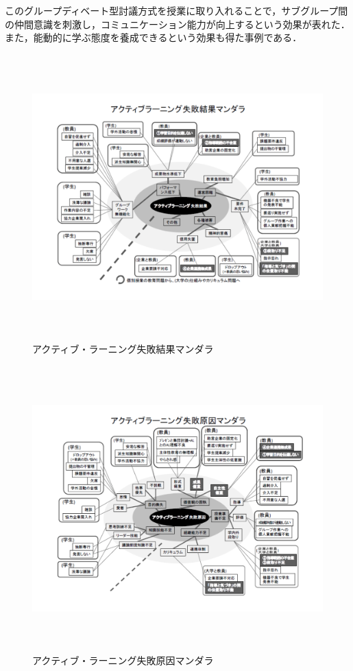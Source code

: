 このグループディベート型討議方式を授業に取り入れることで，サブグループ間の仲間意識を刺激し，コミュニケーション能力が向上するという効果が表れた．また，能動的に学ぶ態度を養成できるという効果も得た事例である．



\begin{figure}[h]
\centering
\includegraphics[height=11cm,width=13cm]{kekka.pdf}
\caption{アクティブ・ラーニング失敗結果マンダラ}\label{サンプル図}
\end{figure}


\begin{figure}[h]
\centering
\includegraphics[height=11cm,width=13cm]{geiin.pdf}
\caption{アクティブ・ラーニング失敗原因マンダラ}\label{サンプル図}
\end{figure}





